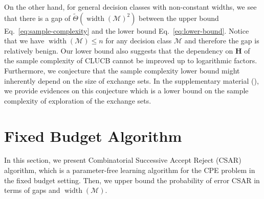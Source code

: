 \documentclass{article}
\newcommand{\Algorithm}{{\small \textsf{CLUCB}}\xspace}
\newcommand{\AlgorithmBud}{{\small \textsf{CSAR}}\xspace}
\newcommand{\Problem}{{CPE}\xspace}
\newcommand{\M}{\mathcal M}
\DeclareMathOperator{\rank}{width}
\newcommand{\Match}{\textsc{Match}\xspace}
\newcommand{\Path}{\textsc{Path}\xspace}
\begin{document}
On the other hand, for general decision classes with non-constant widths, we see that there is a gap of $\tilde \Theta(\rank(\M)^2)$ between the upper bound Eq.~\eqref{eq:sample-complexity} and the lower bound Eq.~\eqref{eq:lower-bound}.
Notice that we have $\rank(\M) \le n$ for any decision class $\M$ and therefore the gap is relatively benign.
Our lower bound also suggests that the dependency on $\mathbf H$ of the sample complexity of \Algorithm cannot be improved up to logarithmic factors.
Furthermore, we conjecture that the sample complexity lower bound might inherently depend on the size of exchange sets. 
In the supplementary material (), we provide evidences on this conjecture which is a lower bound on the sample complexity of exploration of the exchange sets.

\vspace{-0.5em}
\section{Fixed Budget Algorithm}
\vspace{-0.5em}
In this section, we present Combinatorial Successive Accept Reject (\AlgorithmBud) algorithm, which is a parameter-free learning algorithm for the \Problem problem in the fixed budget setting.
Then, we upper bound the probability of error \AlgorithmBud in terms of gaps and $\rank(\M)$.
\end{document}
